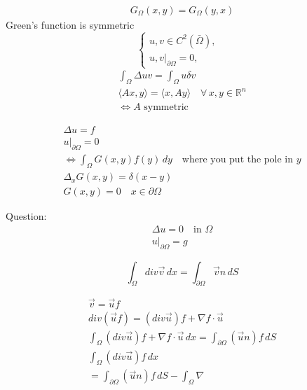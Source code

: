 \documentclass[11pt]{article}
\begin{document}
\begin{align*}
    G_{\Omega}(x,y) = G_{\Omega}(y,x)
\end{align*}
Green's function is symmetric 
\begin{equation}
    \begin{cases} 
    u,v \in C^{2}(\bar{\Omega}), &  \\ 
    u,v|_{\partial \Omega} = 0, &   
    \end{cases}
\end{equation}
\begin{align*}
    \int_{\Omega}\Delta u v = \int_{\Omega} u \delta v \\
    \langle Ax,y \rangle = \langle x, Ay \rangle \quad \forall \, x,y \in \mathbb{R}^{n}\\
    \iff A \text{ symmetric}
\end{align*}



\begin{equation}
    \begin{aligned}
    \Delta u =f \\
    u|_{\partial \Omega} = 0\\
    \iff \int_{\Omega}G(x,y)f(y)\,dy \quad \text{where you put the pole in }y\\
    \Delta_{x}G(x,y) = \delta(x-y)\\
    G(x,y) = 0 \quad x \in \partial \Omega
    \end{aligned}
\end{equation}

Question: 
\begin{equation}
    \begin{aligned}
    \Delta u = 0  \quad \text{in }\Omega\\
    u|_{\partial \Omega} = g
    \end{aligned}
\end{equation}

\begin{definition}
    
\end{definition}

\begin{equation}
    \int_{\Omega}div \vec{v}\,dx = \int_{\partial \Omega}\vec{v} n \,dS
\end{equation}

\begin{align*}
    \vec{v} = \vec{u}f\\
    div(\vec{u}f) = (div\vec{u})f + \nabla f \cdot \vec{u}\\
    \int_{\Omega}(div \vec{u})f + \nabla f \cdot  \vec{u}\, dx = 
        \int_{\partial \Omega}(\vec{u}n)f\,dS\\
    \int_{\Omega}(div\vec{u})f \,dx\\
    = \int_{\partial \Omega}(\vec{u}n)f \,dS - \int_{\Omega}\nabla
\end{align*}
\end{document}
